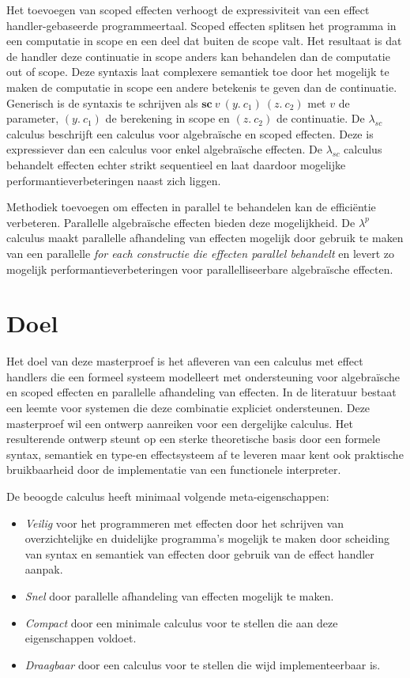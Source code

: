 Het toevoegen van scoped effecten verhoogt de expressiviteit van een effect handler-gebaseerde programmeertaal. Scoped effecten splitsen het programma in een computatie in scope en een deel dat buiten de scope valt. Het resultaat is dat de handler deze continuatie in scope anders kan behandelen dan de computatie out of scope. Deze syntaxis laat complexere semantiek toe door het mogelijk te maken de computatie in scope een andere betekenis te geven dan de  continuatie. Generisch is de syntaxis te schrijven als $\textbf{sc}\:v\:(y.\:c_1)\:(z.\:c_2)$ met $v$ de parameter, $(y.\:c_1)$ de berekening in scope en $(z.\:c_2)$ de continuatie. De $\lambda_{sc}$ calculus \cite{Bosman2022} beschrijft een calculus voor algebraïsche en scoped effecten. Deze is expressiever dan een calculus voor enkel algebraïsche effecten. De $\lambda_{sc}$ calculus behandelt effecten echter strikt sequentieel en laat daardoor mogelijke performantieverbeteringen naast zich liggen. \newline

Methodiek toevoegen om effecten in parallel te behandelen kan de efficiëntie verbeteren. Parallelle algebraïsche effecten\cite{Xie2021} bieden deze mogelijkheid. De $\lambda^{p}$ calculus maakt parallelle afhandeling van effecten mogelijk door gebruik te maken van een parallelle \emph{for each constructie die effecten parallel behandelt} en levert zo mogelijk performantieverbeteringen voor parallelliseerbare algebraïsche effecten. \newline

\section{Doel}
Het doel van deze masterproef is het afleveren van een calculus met effect handlers die een formeel systeem modelleert met ondersteuning voor algebraïsche en scoped effecten en parallelle afhandeling van effecten. In de literatuur bestaat een leemte voor systemen die deze combinatie expliciet ondersteunen. Deze masterproef wil een ontwerp aanreiken voor een dergelijke calculus. Het resulterende ontwerp steunt op een sterke theoretische basis door een formele syntax, semantiek en type-en effectsysteem af te leveren maar kent ook praktische bruikbaarheid door de implementatie van een functionele interpreter. \newline

De beoogde calculus heeft minimaal volgende meta-eigenschappen: 
\begin{itemize}
    \item \emph{Veilig} voor het programmeren met effecten door het schrijven van overzichtelijke en duidelijke programma's mogelijk te maken door scheiding van syntax en semantiek van effecten door gebruik van de effect handler aanpak.
    \item \emph{Snel} door parallelle afhandeling van effecten mogelijk te maken.
    \item \emph{Compact} door een minimale calculus voor te stellen die aan deze eigenschappen voldoet.
    \item \emph{Draagbaar} door een calculus voor te stellen die wijd implementeerbaar is.
\end{itemize}


